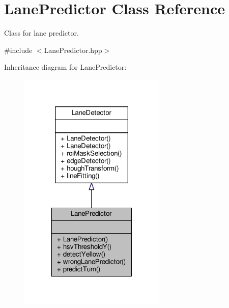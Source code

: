 \hypertarget{classLanePredictor}{}\section{Lane\+Predictor Class Reference}
\label{classLanePredictor}


Class for lane predictor.  




{\ttfamily \#include $<$Lane\+Predictor.\+hpp$>$}



Inheritance diagram for Lane\+Predictor\+:
\nopagebreak
\begin{figure}[H]
\begin{center}
\leavevmode
\includegraphics[width=198pt]{classLanePredictor__inherit__graph}
\end{center}
\end{figure}


